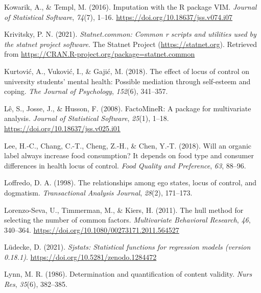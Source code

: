 \documentclass[
  man]{apa6}
\newlength{\cslhangindent}
\newlength{\cslentryspacingunit} %
\newenvironment{CSLReferences}[2] %
 {%
  \setlength{\parindent}{0pt}
  \ifodd #1
  \let\oldpar\par
  \def\par{\hangindent=\cslhangindent\oldpar}
  \fi
  \setlength{\parskip}{#2\cslentryspacingunit}
 }%
 {}
\begin{document}
\begin{CSLReferences}{1}{0}
\leavevmode{}%
Kowarik, A., \& Templ, M. (2016). Imputation with the {R} package {VIM}. \emph{Journal of Statistical Software}, \emph{74}(7), 1--16. \url{https://doi.org/10.18637/jss.v074.i07}

\leavevmode{}%
Krivitsky, P. N. (2021). \emph{Statnet.common: Common r scripts and utilities used by the statnet project software}. The Statnet Project (\url{https://statnet.org}). Retrieved from \url{https://CRAN.R-project.org/package=statnet.common}

\leavevmode{}%
Kurtović, A., Vuković, I., \& Gajić, M. (2018). The effect of locus of control on university students' mental health: Possible mediation through self-esteem and coping. \emph{The Journal of Psychology}, \emph{152}(6), 341--357.

\leavevmode{}%
Lê, S., Josse, J., \& Husson, F. (2008). {FactoMineR}: A package for multivariate analysis. \emph{Journal of Statistical Software}, \emph{25}(1), 1--18. \url{https://doi.org/10.18637/jss.v025.i01}

\leavevmode{}%
Lee, H.-C., Chang, C.-T., Cheng, Z.-H., \& Chen, Y.-T. (2018). Will an organic label always increase food consumption? It depends on food type and consumer differences in health locus of control. \emph{Food Quality and Preference}, \emph{63}, 88--96.

\leavevmode{}%
Loffredo, D. A. (1998). The relationships among ego states, locus of control, and dogmatism. \emph{Transactional Analysis Journal}, \emph{28}(2), 171--173.

\leavevmode{}%
Lorenzo-Seva, U., Timmerman, M., \& Kiers, H. (2011). The hull method for selecting the number of common factors. \emph{Multivariate Behavioral Research}, \emph{46}, 340--364. \url{https://doi.org/10.1080/00273171.2011.564527}

\leavevmode{}%
Lüdecke, D. (2021). \emph{Sjstats: Statistical functions for regression models (version 0.18.1)}. \url{https://doi.org/10.5281/zenodo.1284472}

\leavevmode{}%
Lynn, M. R. (1986). Determination and quantification of content validity. \emph{Nurs Res}, \emph{35}(6), 382--385.


\end{CSLReferences}
\end{document}
